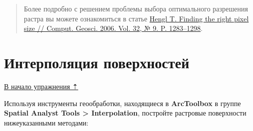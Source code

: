 \documentclass[]{book}
\theoremstyle{definition}
\theoremstyle{definition}
\theoremstyle{definition}
\theoremstyle{remark}
\begin{document}
\begin{quote}
Более подробно с решением проблемы выбора оптимального разрешения растра
вы можете ознакомиться в статье
\href{https://www.researchgate.net/publication/222014409_Finding_the_right_pixel_size}{Hengl
T. Finding the right pixel size // Comput. Geosci. 2006. Vol. 32, № 9.
P. 1283--1298}.
\end{quote}

\hypertarget{interpolation-surfaces}{%
\section{Интерполяция поверхностей}\label{interpolation-surfaces}}

\protect\hyperlink{interpolation}{В начало упражнения ⇡}

Используя инструменты геообработки, находящиеся в \textbf{ArcToolbox} в
группе \textbf{Spatial Analyst Tools \textgreater{} Interpolation},
постройте растровые поверхности нижеуказанными методами:
\end{document}
